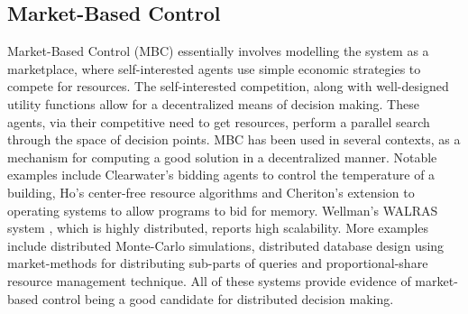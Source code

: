 \documentclass[10pt,journal,compsoc]{IEEEtran}
\begin{document}
\subsection{Market-Based Control}
Market-Based Control (MBC) essentially involves modelling the system as a marketplace, where self-interested agents use simple economic strategies to compete for resources. The self-interested competition, along with well-designed utility functions allow for a decentralized means of decision making. These agents, via their competitive need to get resources, perform a parallel search through the space of decision points. MBC has been used in several contexts, as a mechanism for computing a good solution in a decentralized manner. Notable examples include Clearwater's bidding agents to control the temperature of a building\cite{Clearwater1996Saving}, Ho's center-free resource algorithms \cite{Ho1980class} and Cheriton's extension to operating systems to allow programs to bid for memory\cite{Harty1996market}. Wellman's WALRAS system \cite{Wellman1993market-oriented}, which is highly distributed, reports high scalability. More examples include distributed Monte-Carlo simulations\cite{Waldspurger1992Spawn}, distributed database design using market-methods for distributing sub-parts of queries \cite{Stonebraker1994Economic} and proportional-share resource management technique\cite{Waldspurger1994Lottery}. All of these systems provide evidence of market-based control being a good candidate for distributed decision making. 

\end{document}
